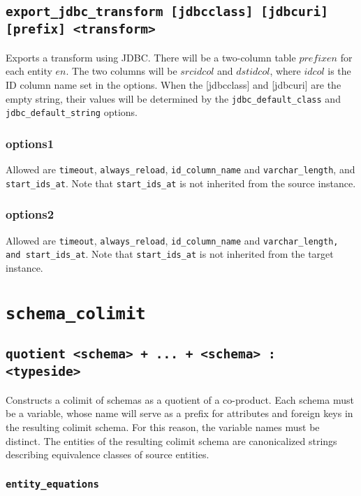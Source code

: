 \documentclass[10pt]{book}
\begin{document}

\section{{\tt export\_jdbc\_transform [jdbcclass] [jdbcuri] [prefix] <transform>}}
Exports a transform using JDBC.  There will be a two-column table $prefixen$ for each entity $en$.  The two columns will be $srcidcol$ and $dstidcol$, where $idcol$ is the ID column name set in the options.   When the [jdbcclass] and [jdbcuri] are the empty string, their values will be determined by the {\tt jdbc\_default\_class} and {\tt jdbc\_default\_string} options.

\subsection{options1}
Allowed are {\tt timeout}, {\tt always\_reload},  {\tt id\_column\_name} and {\tt varchar\_length}, and {\tt start\_ids\_at}.  Note that {\tt start\_ids\_at} is not inherited from the source instance.
\subsection{options2}
Allowed are {\tt timeout}, {\tt always\_reload},  {\tt id\_column\_name} and {\tt varchar\_length, and {\tt start\_ids\_at}}.  Note that {\tt start\_ids\_at} is not inherited from the target instance.

\chapter{{\tt schema\_colimit}}

\section{{\tt quotient <schema> + ... + <schema> : <typeside>}}

Constructs a colimit of schemas as a quotient of a co-product.  Each schema must be a variable, whose name will serve as a prefix for attributes and foreign keys in the resulting colimit schema.  For this reason, the variable names must be distinct.  The entities of the resulting colimit schema are canonicalized strings describing equivalence classes of source entities.

\subsection{{\tt entity\_equations}}
\end{document}
